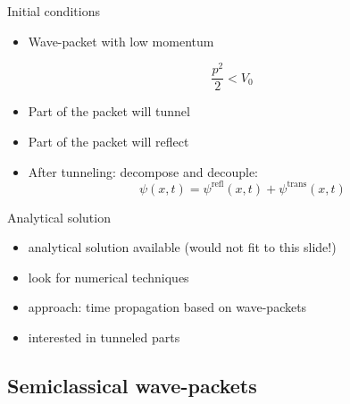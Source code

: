 \documentclass{beamer}
\begin{document}
\begin{frame}{Initial conditions}
  \begin{itemize}
    \item Wave-packet with low momentum
  \end{itemize}

  \begin{equation*}
    \frac{p^2}{2} < V_0
  \end{equation*}
  \begin{itemize}
    \item Part of the packet will tunnel
    \item Part of the packet will reflect
  \end{itemize}
  \begin{itemize}
    \item After tunneling: decompose and decouple:
    \begin{equation*}
      \psi(x,t) = \psi^{\text{refl}}(x,t) + \psi^{\text{trans}}(x,t)
    \end{equation*}
  \end{itemize}
\end{frame}


\begin{frame}{Analytical solution}
  \begin{itemize}
    \item analytical solution available (would not fit to this slide!)
    \item look for numerical techniques
    \item approach: time propagation based on wave-packets
    \item interested in tunneled parts
  \end{itemize}
\end{frame}


\subsection{Semiclassical wave-packets}
\end{document}
